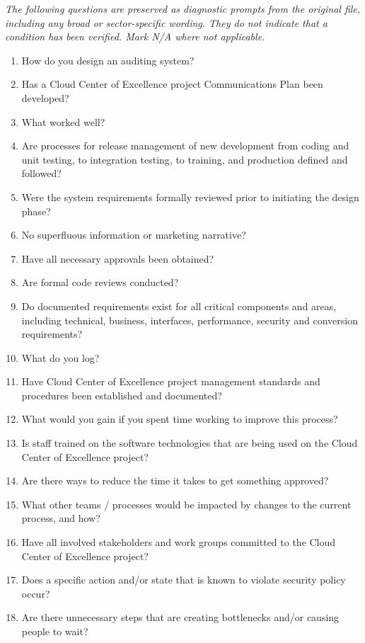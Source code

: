 \documentclass[10pt,letterpaper]{article}
\newcommand{\docsection}[1]{\par\Needspace{5\baselineskip}\vspace{8pt}{\large\sffamily\bfseries\color{navy}#1}\par\vspace{2pt}{\color{rulegrey}\rule{\linewidth}{.6pt}}\par}
\begin{document}
\docsection{03 \quad Source diagnostic checklist}
\textit{The following questions are preserved as diagnostic prompts from the original file, including any broad or sector-specific wording. They do not indicate that a condition has been verified. Mark N/A where not applicable.}
\begingroup\small\begin{enumerate}[leftmargin=2.1em, itemsep=4pt]
\item[1.] How do you design an auditing system?
\item[2.] Has a Cloud Center of Excellence project Communications Plan been developed?
\item[3.] What worked well?
\item[4.] Are processes for release management of new development from coding and unit testing, to integration testing, to training, and production defined and followed?
\item[5.] Were the system requirements formally reviewed prior to initiating the design phase?
\item[6.] No superfluous information or marketing narrative?
\item[7.] Have all necessary approvals been obtained?
\item[8.] Are formal code reviews conducted?
\item[9.] Do documented requirements exist for all critical components and areas, including technical, business, interfaces, performance, security and conversion requirements?
\item[10.] What do you log?
\item[11.] Have Cloud Center of Excellence project management standards and procedures been established and documented?
\item[12.] What would you gain if you spent time working to improve this process?
\item[13.] Is staff trained on the software technologies that are being used on the Cloud Center of Excellence project?
\item[14.] Are there ways to reduce the time it takes to get something approved?
\item[15.] What other teams / processes would be impacted by changes to the current process, and how?
\item[16.] Have all involved stakeholders and work groups committed to the Cloud Center of Excellence project?
\item[17.] Does a specific action and/or state that is known to violate security policy occur?
\item[18.] Are there unnecessary steps that are creating bottlenecks and/or causing people to wait?

\end{enumerate}
\end{document}
